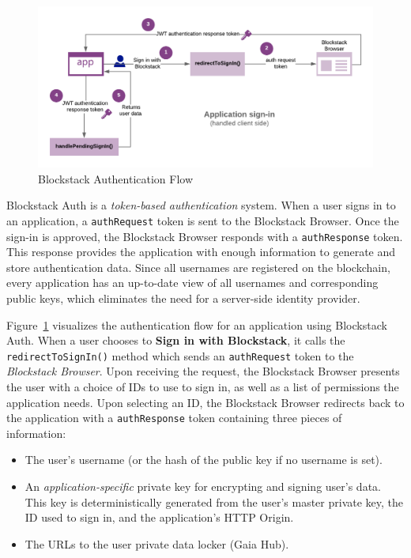		\begin{figure}[h]
			\includegraphics[width=\linewidth]{figures/app-sign-in}
			\caption{\label{fig:app-sign-in} Blockstack Authentication Flow\protect\cite{image:blockstack:auth:1}}
		\end{figure}
		
		Blockstack Auth\cite{blockstack:auth:1} is a \textit{token-based authentication}\cite{token:auth:1} system. When a user signs in to an application, a \texttt{authRequest} token is sent to the Blockstack Browser. Once the sign-in is approved, the Blockstack Browser responds with a \texttt{authResponse} token. This response provides the application with enough information to generate and store authentication data. Since all usernames are registered on the blockchain, every application has an up-to-date view of all usernames and corresponding public keys, which eliminates the need for a server-side identity provider.
		
		Figure~\ref{fig:app-sign-in} visualizes the authentication flow for an application using Blockstack Auth. When a user chooses to \textbf{Sign in with Blockstack}, it calls the \texttt{redirectToSignIn()} method which sends an \texttt{authRequest} token to the \textit{Blockstack Browser}\cite{github:bb:1}. Upon receiving the request, the Blockstack Browser presents the user with a choice of IDs to use to sign in, as well as a list of permissions the application needs. Upon selecting an ID, the Blockstack Browser redirects back to the application with a \texttt{authResponse} token containing three pieces of information\cite{blockstack2019whitepaper}:
		\begin{itemize}
			\item The user's username (or the hash of the public key if no username is set).
			\item An \textit{application-specific} private key for encrypting and signing user's data. This key is deterministically generated from the user's master private key, the ID used to sign in, and the application's HTTP Origin.
			\item The URLs to the user private data locker (Gaia Hub\cite{github:gaia:hub:1}).
		\end{itemize}
		
